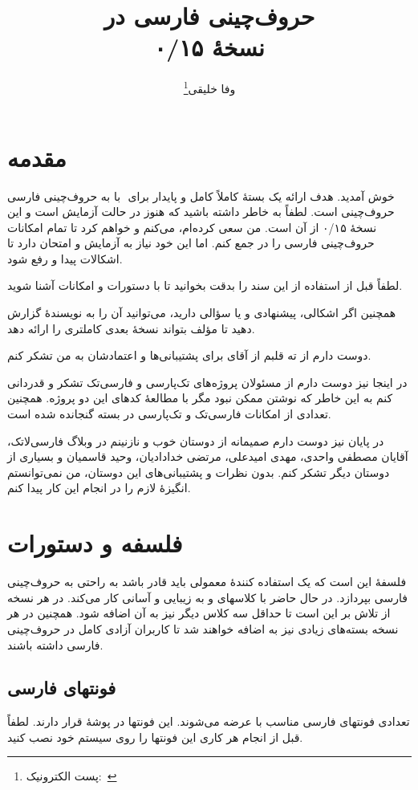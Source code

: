\documentclass{report}
\title{حروف‌چینی فارسی در \eng{\XePersian}\\[0.2cm]نسخهٔ ۰/۱۵}
\author{وفا خلیقی\thanks{پست الکترونیک:~\eng{vafa.khalighi@students.mq.edu.au}}}
\begin{document}
\maths
\begin{farsi}
\maketitle
\tableofcontents
\chapter{مقدمه}
به حروف‌چینی فارسی ‪ ‬با ‪\eng{\XePersian} ‬خوش آمدید. هدف \eng{\XePersian} ارائه یک بستهٔ کاملاً کامل و پایدار برای حروف‌چینی است. لطفاً به خاطر داشته باشید که \eng{\XePersian} هنوز در حالت آزمایش است و این نسخهٔ ۰/۱۵ از آن است. من سعی کرده‌ام، می‌کنم و خواهم کرد تا تمام امکانات حروف‌چینی فارسی را در \eng{\XePersian} جمع کنم. اما این خود نیاز به آزمایش و امتحان دارد تا اشکالات پیدا و رفع شود.

لطفاً قبل از استفاده از \eng{\XePersian} این سند را بدقت بخوانید تا با دستورات و امکانات \eng{\XePersian} آشنا شوید.

همچنین اگر اشکالی، پیشنهادی و یا سؤالی دارید، می‌توانید آن را به نویسندهٔ \eng{\XePersian} گزارش دهید تا مؤلف \eng{\XePersian} بتواند نسخهٔ بعدی کاملتری را ارائه دهد.

دوست دارم از ته قلبم از آقای  برای پشتیبانی‌ها و اعتمادشان به من تشکر کنم.

در اینجا نیز دوست دارم از مسئولان پروژه‌های تک‌پارسی و فارسی‌تک تشکر و قدردانی کنم به این خاطر که نوشتن \eng{\XePersian} ممکن نبود مگر با مطالعهٔ کدهای این دو پروژه. همچنین تعدادی از امکانات فارسی‌تک و  تک‌پارسی در بسته گنجانده شده است.

در پایان نیز دوست دارم صمیمانه از دوستان خوب و نازنینم در وبلاگ فارسی‌لاتک، آقایان مصطفی واحدی، مهدی امیدعلی، مرتضی خدادادیان، وحید قاسمیان و بسیاری از دوستان دیگر تشکر کنم. بدون نظرات و پشتیبانی‌های این دوستان، من نمی‌توانستم انگیزهٔ لازم را در انجام این کار پیدا کنم.
\chapter{فلسفه و دستورات}
فلسفهٔ \eng{\XePersian} این است که یک استفاده کنندهٔ معمولی باید قادر باشد به راحتی به حروف‌چینی فارسی بپردازد. در حال حاضر \eng{\XePersian} با کلاسهای  و  به زیبایی و آسانی کار می‌کند. در هر نسخه از \eng{\XePersian} تلاش بر این است تا حداقل سه کلاس دیگر نیز به آن اضافه شود. همچنین در هر نسخه بسته‌های زیادی نیز به \eng{\XePersian} اضافه خواهند شد تا کاربران آزادی کامل در حروف‌چینی فارسی داشته باشند.
\section{فونتهای فارسی}
تعدادی فونتهای فارسی مناسب با \eng{\XePersian} عرضه می‌شوند. این فونتها در پوشهٔ  قرار دارند. لطفاً قبل از انجام هر کاری این فونتها را روی سیستم خود نصب کنید.

\end{farsi}
\end{document}
